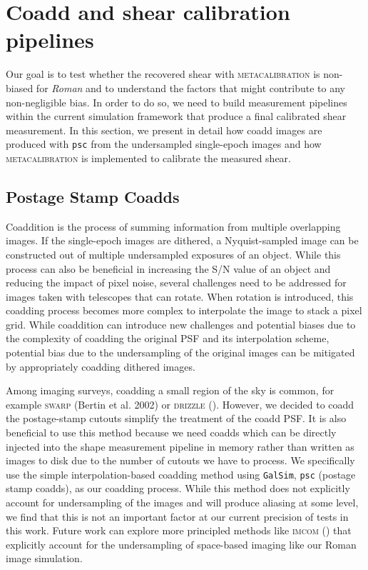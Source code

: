 \documentclass[fleqn,usenatbib]{mnras}
\begin{document}
\section{Coadd and shear calibration pipelines}
\label{sec:methods}
Our goal is to test whether the recovered shear with \textsc{metacalibration} is non-biased for \emph{Roman} and to understand the factors that might contribute to any non-negligible bias. In order to do so, we need to build measurement pipelines within the current simulation framework that produce a final calibrated shear measurement. In this section, we present in detail how coadd images are produced with \texttt{psc} from the undersampled single-epoch images and how \textsc{metacalibration} is implemented to calibrate the measured shear. 


\subsection{Postage Stamp Coadds}
\label{subsec:psc}
Coaddition is the process of summing information from multiple overlapping images. If the single-epoch images are dithered, a Nyquist-sampled image can be constructed out of multiple undersampled exposures of an object. While this process can also be beneficial in increasing the S/N value of an object and reducing the impact of pixel noise, several challenges need to be addressed for images taken with telescopes that can rotate. When rotation is introduced, this coadding process becomes more complex to interpolate the image to stack a pixel grid. While coaddition can introduce new challenges and potential biases due to the complexity of coadding the original PSF and its interpolation scheme, potential bias due to the undersampling of the original images can be mitigated by appropriately coadding dithered images. 

Among imaging surveys, coadding a small region of the sky is common, for example \textsc{swarp} (Bertin et al. 2002) or \textsc{drizzle} (\citealt{2002PASP..114..144F}). However, we decided to coadd the postage-stamp cutouts simplify the treatment of the coadd PSF. It is also beneficial to use this method because we need coadds which can be directly injected into the shape measurement pipeline in memory rather than written as images to disk due to the number of cutouts we have to process. We specifically use the simple interpolation-based coadding method using \texttt{GalSim}, \texttt{psc} (postage stamp coadds), as our coadding process.
While this method does not explicitly account for undersampling of the images and will produce aliasing at some level, we find that this is not an important factor at our current precision of tests in this work. Future work can explore more principled methods like \textsc{imcom} (\citealt{2011ApJ...741...46R}) that explicitly account for the undersampling of space-based imaging like our Roman image simulation.
\end{document}

